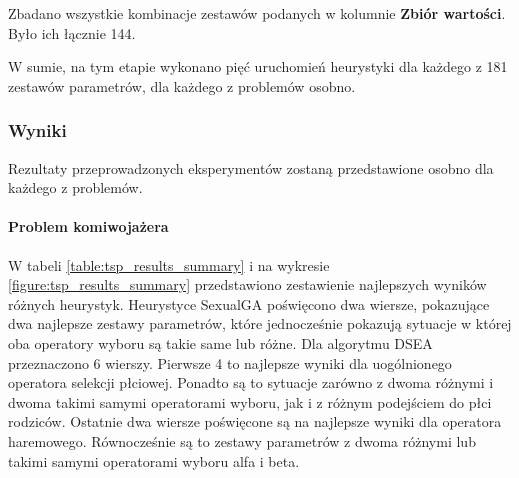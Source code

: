 \documentclass[./FM_mgr.tex]{subfiles}
\begin{document}
Zbadano wszystkie kombinacje zestawów podanych w kolumnie \textbf{Zbiór wartości}.
Było ich łącznie 144.

W sumie, na tym etapie wykonano pięć uruchomień heurystyki dla każdego z 181 zestawów parametrów, dla każdego z problemów osobno.

\subsubsection*{Wyniki}

Rezultaty przeprowadzonych eksperymentów zostaną przedstawione osobno dla każdego z problemów.

\paragraph{Problem komiwojażera}

W tabeli \ref{table:tsp_results_summary} i na wykresie \ref{figure:tsp_results_summary} przedstawiono zestawienie najlepszych wyników różnych heurystyk.
Heurystyce SexualGA poświęcono dwa wiersze, pokazujące dwa najlepsze zestawy parametrów, które jednocześnie pokazują sytuacje w której oba operatory wyboru są takie same lub różne.
Dla algorytmu DSEA przeznaczono 6 wierszy. 
Pierwsze 4 to najlepsze wyniki dla uogólnionego operatora selekcji płciowej.
Ponadto są to sytuacje zarówno z dwoma różnymi i dwoma takimi samymi operatorami wyboru, jak i z różnym podejściem do płci rodziców.
Ostatnie dwa wiersze poświęcone są na najlepsze wyniki dla operatora haremowego.
Równocześnie są to zestawy parametrów z dwoma różnymi lub takimi samymi operatorami wyboru alfa i beta.

\newpage
\end{document}
